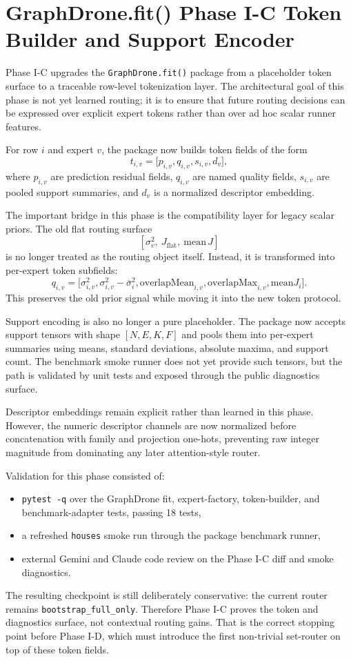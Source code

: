 \section{GraphDrone.fit() Phase I-C Token Builder and Support Encoder}

Phase I-C upgrades the \texttt{GraphDrone.fit()} package from a placeholder token surface to a traceable row-level tokenization layer. The architectural goal of this phase is not yet learned routing; it is to ensure that future routing decisions can be expressed over explicit expert tokens rather than over ad hoc scalar runner features.

For row \(i\) and expert \(v\), the package now builds token fields of the form
\[
t_{i,v} =
\big[
p_{i,v},
q_{i,v},
s_{i,v},
d_v
\big],
\]
where \(p_{i,v}\) are prediction residual fields, \(q_{i,v}\) are named quality fields, \(s_{i,v}\) are pooled support summaries, and \(d_v\) is a normalized descriptor embedding.

The important bridge in this phase is the compatibility layer for legacy scalar priors. The old flat routing surface
\[
\left[\sigma^2_v,\ J_{\mathrm{flat}},\ \mathrm{mean}\,J\right]
\]
is no longer treated as the routing object itself. Instead, it is transformed into per-expert token subfields:
\[
q_{i,v} =
\big[
\sigma^2_{i,v},
\sigma^2_{i,v} - \bar{\sigma}^2_i,
\mathrm{overlapMean}_{i,v},
\mathrm{overlapMax}_{i,v},
\mathrm{mean}J_i
\big].
\]
This preserves the old prior signal while moving it into the new token protocol.

Support encoding is also no longer a pure placeholder. The package now accepts support tensors with shape \([N, E, K, F]\) and pools them into per-expert summaries using means, standard deviations, absolute maxima, and support count. The benchmark smoke runner does not yet provide such tensors, but the path is validated by unit tests and exposed through the public diagnostics surface.

Descriptor embeddings remain explicit rather than learned in this phase. However, the numeric descriptor channels are now normalized before concatenation with family and projection one-hots, preventing raw integer magnitude from dominating any later attention-style router.

Validation for this phase consisted of:
\begin{itemize}
\item \texttt{pytest -q} over the GraphDrone fit, expert-factory, token-builder, and benchmark-adapter tests, passing 18 tests,
\item a refreshed \texttt{houses} smoke run through the package benchmark runner,
\item external Gemini and Claude code review on the Phase I-C diff and smoke diagnostics.
\end{itemize}

The resulting checkpoint is still deliberately conservative: the current router remains \texttt{bootstrap\_full\_only}. Therefore Phase I-C proves the token and diagnostics surface, not contextual routing gains. That is the correct stopping point before Phase I-D, which must introduce the first non-trivial set-router on top of these token fields.
